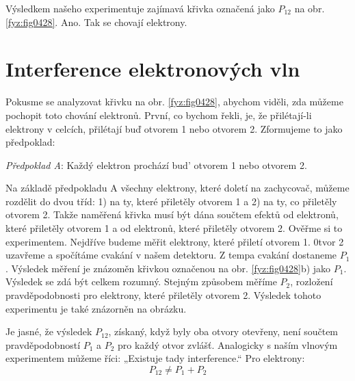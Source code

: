    Výsledkem našeho experimentuje zajímavá křivka označená jako \(P_{12}\) na obr.
    \ref{fyz:fig0428}. Ano. Tak se chovají elektrony.

  \section{Interference elektronových vln}\label{fyz:IchapXXXVIIsecV}
    Pokusme se analyzovat křivku na obr. \ref{fyz:fig0428}, abychom viděli, zda můžeme pochopit toto
    chování elektronů. První, co bychom řekli, je, že přilétají-li elektrony v celcích, přilétají
    buď otvorem 1 nebo otvorem 2. Zformujeme to jako předpoklad:
    
    \emph{Předpoklad A}: Každý elektron prochází bud' otvorem 1 nebo otvorem 2.
    
    Na základě předpokladu A všechny elektrony, které doletí na zachycovač, můžeme rozdělit do dvou
    tříd: 1) na ty, které přiletěly otvorem 1 a 2) na ty, co přiletěly otvorem 2. Takže naměřená
    křivka musí být dána součtem efektů od elektronů, které přiletěly otvorem 1 a od elektronů,
    které přiletěly otvorem 2. Ověřme si to experimentem. Nejdříve budeme měřit elektrony, které
    přiletí otvorem 1. 0tvor 2 uzavřeme a spočítáme cvakání v našem detektoru. Z tempa cvakání
    dostaneme \(P_1\). Výsledek měření je znázoměn křivkou označenou na obr. \ref{fyz:fig0428}b) jako
    \(P_1\). Výsledek se zdá být celkem rozumný. Stejným způsobem měříme \(P_2\), rozložení
    pravděpodobnosti pro elektrony, které přiletěly otvorem 2. Výsledek tohoto experimentu je také
    znázorněn na obrázku.
    
    Je jasné, že výsledek \(P_{12}\), získaný, když byly oba otvory otevřeny, není součtem
    pravděpodobností \(P_1\) a \(P_2\) pro každý otvor zvlášť. Analogicky s naším vlnovým
    experimentem můžeme říci: „Existuje tady interference.“ Pro elektrony:
    \begin{equation*}
      P_{12} \neq P_1 + P_2
    \end{equation*}

